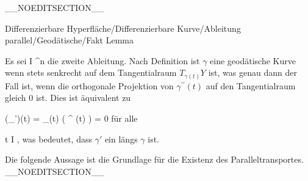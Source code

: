 __NOEDITSECTION__

{Differenzierbare Hyperfläche/Differenzierbare Kurve/Ableitung parallel/Geodätische/Fakt}
{Lemma}
{}
{

\faktzusatz {}
\faktzusatz {}

}
{

Es sei
\maabbdisp {\gamma^{\prime \prime}} { I } { \R^n
} {}
die zweite Ableitung. Nach Definition ist $\gamma$ eine geodätische Kurve wenn
 stets senkrecht auf dem Tangentialraum $T_{\gamma(t)} Y$ ist, was genau dann der Fall ist, wenn die orthogonale Projektion von $\gamma^{\prime \prime}(t)$ auf den Tangentialraum gleich $0$ ist. Dies ist äquivalent zu

\mavergleichskettedisp
{\vergleichskette
{ (\nabla_\gamma \gamma')(t)
}
{ =} { \pi_{\gamma(t)} \left(  \gamma^{\prime \prime} (t)  \right)
}
{ =} { 0
}
{ } {
}
{ } {
}
}
{}{}{}
für alle

\mavergleichskette
{\vergleichskette
{ t
}
{ \in }{ I
}
{  }{
}
{    }{
}
{   }{
}
}
{}{}{,}
was bedeutet, dass $\gamma'$ ein
längs $\gamma$ ist.

}

Die folgende Aussage ist die Grundlage für die Existenz des Paralleltransportes.
__NOEDITSECTION__

